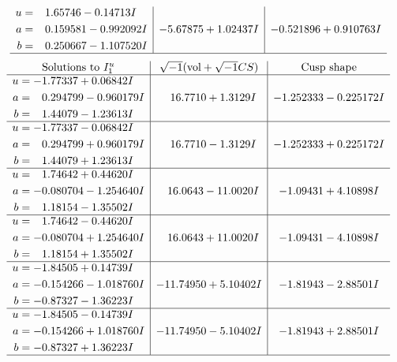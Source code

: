 \documentclass[1p]{elsarticle_modified}
\theoremstyle{definition}
\newcommand{\I}{\sqrt{-1}}
\begin{document}
$$\begin{array}{c|c|c}
\begin{aligned}
u &= \phantom{-}1.65746 - 0.14713 I \\
a &= \phantom{-}0.159581 - 0.992092 I \\
b &= \phantom{-}0.250667 - 1.107520 I\end{aligned}
 & -5.67875 + 1.02437 I & -0.521896 + 0.910763 I\\
 \hline 
 \end{array}$$\newpage$$\begin{array}{c|c|c}  
\text{Solutions to }I^u_{1}& \I (\text{vol} + \sqrt{-1}CS) & \text{Cusp shape}\\
 \hline 
\begin{aligned}
u &= -1.77337 + 0.06842 I \\
a &= \phantom{-}0.294799 - 0.960179 I \\
b &= \phantom{-}1.44079 - 1.23613 I\end{aligned}
 & \phantom{-}16.7710 + 1.3129 I & -1.252333 - 0.225172 I \\ \hline\begin{aligned}
u &= -1.77337 - 0.06842 I \\
a &= \phantom{-}0.294799 + 0.960179 I \\
b &= \phantom{-}1.44079 + 1.23613 I\end{aligned}
 & \phantom{-}16.7710 - 1.3129 I & -1.252333 + 0.225172 I \\ \hline\begin{aligned}
u &= \phantom{-}1.74642 + 0.44620 I \\
a &= -0.080704 - 1.254640 I \\
b &= \phantom{-}1.18154 - 1.35502 I\end{aligned}
 & \phantom{-}16.0643 - 11.0020 I & -1.09431 + 4.10898 I \\ \hline\begin{aligned}
u &= \phantom{-}1.74642 - 0.44620 I \\
a &= -0.080704 + 1.254640 I \\
b &= \phantom{-}1.18154 + 1.35502 I\end{aligned}
 & \phantom{-}16.0643 + 11.0020 I & -1.09431 - 4.10898 I \\ \hline\begin{aligned}
u &= -1.84505 + 0.14739 I \\
a &= -0.154266 - 1.018760 I \\
b &= -0.87327 - 1.36223 I\end{aligned}
 & -11.74950 + 5.10402 I & -1.81943 - 2.88501 I \\ \hline\begin{aligned}
u &= -1.84505 - 0.14739 I \\
a &= -0.154266 + 1.018760 I \\
b &= -0.87327 + 1.36223 I\end{aligned}
 & -11.74950 - 5.10402 I & -1.81943 + 2.88501 I\\
 \hline 
 \end{array}$$\newpage\newpage\renewcommand{\arraystretch}{1}
\end{document}
